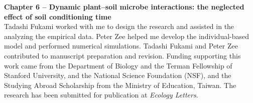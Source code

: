 \noindent \textbf{Chapter 6 -- Dynamic plant--soil microbe interactions: the neglected effect of soil conditioning time}\\
\noindent Tadashi Fukami worked with me to design the research and assisted in the analyzing the empirical data. Peter Zee helped me develop the individual-based model and performed numerical simulations. Tadashi Fukami and Peter Zee contributed to manuscript preparation and revision. Funding supporting this work came from the Department of Biology and the Terman Fellowship of Stanford University, and the National Science Foundation (NSF), and the Studying Abroad Scholarship from the Ministry of Education, Taiwan. The research has been submitted for publication at \textit{Ecology Letters}.




